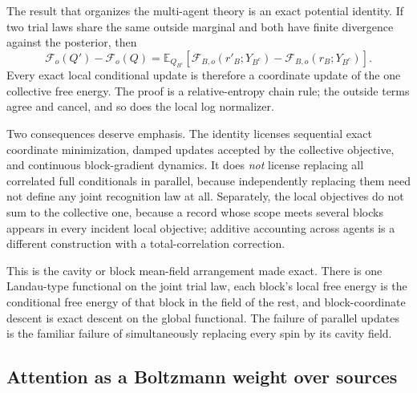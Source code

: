 \documentclass[11pt,letterpaper]{article}
\newcommand{\Ex}{\mathbb E}
\begin{document}
The result that organizes the multi-agent theory is an exact potential identity. If two trial laws share the same outside marginal and both have finite divergence against the posterior, then
\begin{equation}
  \mathcal F_o(Q')-\mathcal F_o(Q)
  =\Ex_{Q_{B^c}}\left[\mathcal F_{B,o}(r'_B;Y_{B^c})-\mathcal F_{B,o}(r_B;Y_{B^c})\right].
  \label{eq:local-global}
\end{equation}
Every exact local conditional update is therefore a coordinate update of the one collective free energy. The proof is a relative-entropy chain rule; the outside terms agree and cancel, and so does the local log normalizer.

Two consequences deserve emphasis. The identity licenses sequential exact coordinate minimization, damped updates accepted by the collective objective, and continuous block-gradient dynamics. It does \emph{not} license replacing all correlated full conditionals in parallel, because independently replacing them need not define any joint recognition law at all. Separately, the local objectives do not sum to the collective one, because a record whose scope meets several blocks appears in every incident local objective; additive accounting across agents is a different construction with a total-correlation correction.

\begin{physicalreading}
This is the cavity or block mean-field arrangement made exact. There is one Landau-type functional on the joint trial law, each block's local free energy is the conditional free energy of that block in the field of the rest, and block-coordinate descent is exact descent on the global functional. The failure of parallel updates is the familiar failure of simultaneously replacing every spin by its cavity field.
\end{physicalreading}

\subsection{Attention as a Boltzmann weight over sources}
\end{document}

